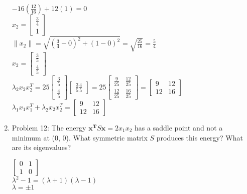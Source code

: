 \documentclass{article}
\renewcommand{\(}{\left(}
\renewcommand{\)}{\right)}
\theoremstyle{plain}
\theoremstyle{plain}
\theoremstyle{definition}
\begin{document}
\begin{enumerate}[label*=\arabic*.,ref=\arabic*]
\begin{shaded}
$-16(\frac{12}{16}) + 12(1) = 0$ \\

$x_2 = \begin{bmatrix} \frac{3}{4} \\ 1 \end{bmatrix}$ \\

$\lVert x_2 \rVert = \sqrt{(\frac{3}{4} - 0)^2 + (1 - 0)^2} = \sqrt{\frac{25}{16}} = \frac{5}{4}$ \\

$x_2 = \begin{bmatrix} \frac{3}{5} \\ \frac{4}{5} \end{bmatrix}$ \\

$\lambda_2x_2x_2^T = 25 \begin{bmatrix} \frac{3}{5} \\ \frac{4}{5} \end{bmatrix} \begin{bmatrix} \frac{3}{5} \frac{4}{5} \end{bmatrix} = 25 \begin{bmatrix} \frac{9}{25} & \frac{12}{25} \\ \frac{12}{25} & \frac{16}{25} \end{bmatrix} = \begin{bmatrix} 9 & 12 \\ 12 & 16 \end{bmatrix}$ \\

$\lambda_1x_1x_1^T + \lambda_2x_2x_2^T = \begin{bmatrix} 9 & 12 \\ 12 & 16 \end{bmatrix}$ 
\end{shaded}

\item Problem 12: The energy $\mathbf{x^T}S\mathbf{x} = 2x_1x_2$ has a saddle point and not a minimum at (0, 0). What symmetric matrix $S$ produces this energy? What are its eigenvalues? 
\begin{shaded}
$\begin{bmatrix} 0 & 1 \\ 1 & 0 \end{bmatrix}$ \\

$\lambda^2 - 1 = (\lambda + 1)(\lambda - 1)$ \\
$\lambda = \pm 1$ \\


\end{shaded}
\end{enumerate}
\end{document}
